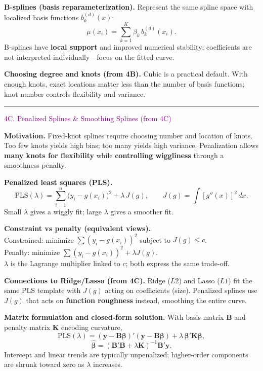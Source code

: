 \documentclass[
  letterpaper,
  DIV=11,
  numbers=noendperiod]{scrreprt}
\begin{document}
\textbf{B-splines (basis reparameterization).} Represent the same spline
space with localized basis functions \(b_k^{(d)}(x)\): \[
\mu(x_i)=\sum_{k=1}^{K}\beta_k\, b_k^{(d)}(x_i).
\] B-splines have \textbf{local support} and improved numerical
stability; coefficients are not interpreted individually---focus on the
fitted curve.

\textbf{Choosing degree and knots (from 4B).} Cubic is a practical
default. With enough knots, exact locations matter less than the number
of basis functions; knot number controls flexibility and variance.

\begin{center}\rule{0.5\linewidth}{0.5pt}\end{center}

\textcolor{purple}{4C. Penalized Splines & Smoothing Splines (from 4C)}

\textbf{Motivation.} Fixed-knot splines require choosing number and
location of knots. Too few knots yields high bias; too many yields high
variance. Penalization allows \textbf{many knots for flexibility} while
\textbf{controlling wiggliness} through a smoothness penalty.

\textbf{Penalized least squares (PLS).} \[
\text{PLS}(\lambda)=\sum_{i=1}^{n}\big(y_i-g(x_i)\big)^2+\lambda\,J(g),
\qquad J(g)=\int [g''(x)]^2\,dx.
\] Small \(\lambda\) gives a wiggly fit; large \(\lambda\) gives a
smoother fit.

\textbf{Constraint vs penalty (equivalent views).}\\
Constrained: minimize \(\sum (y_i-g(x_i))^2\) subject to
\(J(g)\le c\).\\
Penalty: minimize \(\sum (y_i-g(x_i))^2+\lambda J(g)\).\\
\(\lambda\) is the Lagrange multiplier linked to \(c\); both express the
same trade-off.

\textbf{Connections to Ridge/Lasso (from 4C).} Ridge (\(L2\)) and Lasso
(\(L1\)) fit the same PLS template with \(J(g)\) acting on coefficients
(size). Penalized splines use \(J(g)\) that acts on \textbf{function
roughness} instead, smoothing the entire curve.

\textbf{Matrix formulation and closed-form solution.} With basis matrix
\(\mathbf{B}\) and penalty matrix \(\mathbf{K}\) encoding curvature, \[
\text{PLS}(\lambda)=(\mathbf{y}-\mathbf{B}\boldsymbol{\beta})'(\mathbf{y}-\mathbf{B}\boldsymbol{\beta})+\lambda\,\boldsymbol{\beta}'\mathbf{K}\boldsymbol{\beta},
\] \[
\hat{\boldsymbol{\beta}}=(\mathbf{B}'\mathbf{B}+\lambda \mathbf{K})^{-1}\mathbf{B}'\mathbf{y}.
\] Intercept and linear trends are typically unpenalized; higher-order
components are shrunk toward zero as \(\lambda\) increases.
\end{document}
